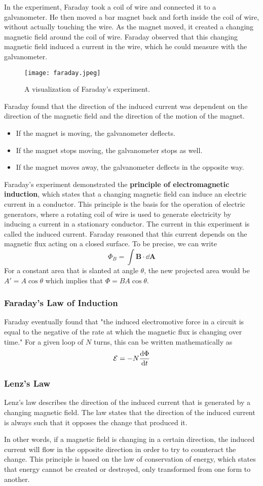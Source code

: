 \documentclass[12pt]{article}
\let\vec\mathbf
\begin{document}
In the experiment, Faraday took a coil of wire and connected it to a galvanometer. He then moved a bar magnet back and forth inside the coil of wire, without actually touching the wire. As the magnet moved, it created a changing magnetic field around the coil of wire. Faraday observed that this changing magnetic field induced a current in the wire, which he could measure with the galvanometer.
    \begin{figure}[H]
  \centering
      \texttt{[image: faraday.jpeg]}
      \caption{A visualization of Faraday's experiment.}
  \end{figure}
Faraday found that the direction of the induced current was dependent on the direction of the magnetic field and the direction of the motion of the magnet.   \begin{itemize}
    \item If the magnet is moving, the galvanometer deflects.
    \item If the magnet stops moving, the galvanometer stops as well. 
    \item If the magnet moves away, the galvanometer deflects in the opposite way.
  \end{itemize}

Faraday's experiment demonstrated the \textbf{principle of electromagnetic induction}, which states that a changing magnetic field can induce an electric current in a conductor. This principle is the basis for the operation of electric generators, where a rotating coil of wire is used to generate electricity by inducing a current in a stationary conductor.
  The current in this experiment is called the induced current. Faraday reasoned that this current depends on the magnetic flux acting on a closed surface. To be precise, we can write 
  \[\Phi_B = \int \vec B \cdot \dd \vec A\]
  For a constant area that is slanted at angle $\theta$, the new projected area would be $A' = A\cos\theta$ which implies that $\Phi = BA\cos\theta$.
  \subsubsection{Faraday's Law of Induction}
  Faraday eventually found that "the induced electromotive force in a circuit is equal to the negative of the rate at which the magnetic flux is changing over time." For a given loop of $N$ turns, this can be written mathematically as 
  \[\mathcal{E} = -N\dv{\Phi}{t}\]
  \subsubsection{Lenz's Law}
  \begin{idea}
  Lenz's law describes the direction of the induced current that is generated by a changing magnetic field. The law states that the direction of the induced current is always such that it opposes the change that produced it.
\end{idea}
In other words, if a magnetic field is changing in a certain direction, the induced current will flow in the opposite direction in order to try to counteract the change. This principle is based on the law of conservation of energy, which states that energy cannot be created or destroyed, only transformed from one form to another.
\end{document}

